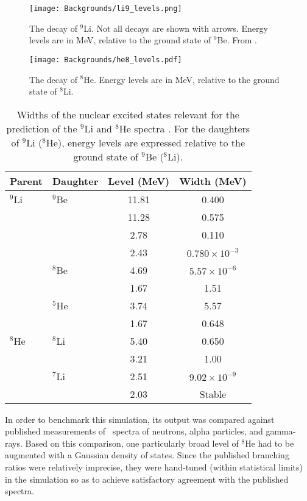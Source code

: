 \documentclass[../thesis.tex]{subfiles}
\begin{document}
\begin{figure}[h]
  \texttt{[image: Backgrounds/li9\_levels.png]}
  \caption{The decay of $^9$Li. Not all decays are shown with arrows. Energy levels are in MeV, relative to the ground state of $^9$Be. From \cite{pedroLi9Spec2}.}
  \label{fig:li9_levels}
\end{figure}

\begin{figure}[h]
  \texttt{[image: Backgrounds/he8\_levels.pdf]}
  \caption{The decay of $^8$He. Energy levels are in MeV, relative to the ground state of $^8$Li.}
  \label{fig:he8_levels}
\end{figure}

\begin{table}[ht]
  \begin{tabular}{llcc}
    \toprule
    Parent & Daughter & Level (MeV) & Width (MeV) \\
    \midrule
    $^9$Li & $^9$Be & 11.81 & 0.400 \\
           & & 11.28 & 0.575 \\
           & & 2.78 & 0.110 \\
           & & 2.43 & $0.780 \times 10^{-3}$ \\
           & $^8$Be & 4.69 & $5.57 \times 10^{-6}$ \\
           & & 1.67 & 1.51 \\
           & $^5$He & 3.74 & 5.57 \\
           & & 1.67 & 0.648 \\
    \midrule
    $^8$He & $^8$Li & 5.40 & 0.650 \\
           & & 3.21 & 1.00 \\
           & $^7$Li & 2.51 & $9.02\times10^{-9}$ \\
           & & 2.03 & Stable \\
    \bottomrule
  \end{tabular}
  \caption{Widths of the nuclear excited states relevant for the prediction of the $^9$Li and $^8$He spectra \cite{ENDF}. For the daughters of $^9$Li ($^8$He), energy levels are expressed relative to the ground state of $^9$Be ($^8$Li).}
  \label{tab:bkgLi9Widths}
\end{table}

In order to benchmark this simulation, its output was compared against published measurements of \LiHe\ spectra of neutrons, alpha particles, and gamma-rays. Based on this comparison, one particularly broad level of $^8$He had to be augmented with a Gaussian density of states. Since the published branching ratios were relatively imprecise, they were hand-tuned (within statistical limits) in the simulation so as to achieve satisfactory agreement with the published spectra.
\end{document}
